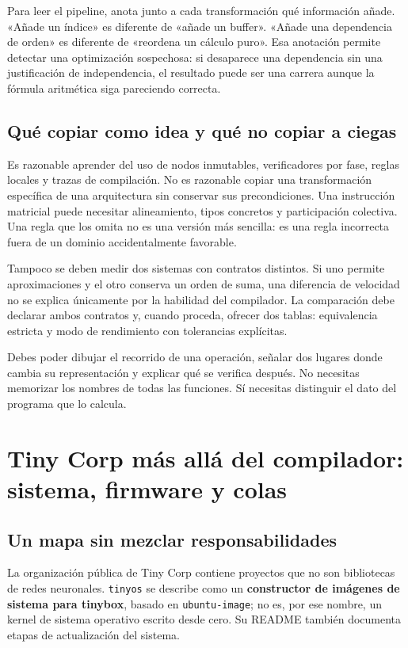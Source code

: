 \documentclass[12pt,a4paper,oneside]{report}
\begin{document}
Para leer el pipeline, anota junto a cada transformación qué información añade. «Añade un índice» es diferente de «añade un buffer». «Añade una dependencia de orden» es diferente de «reordena un cálculo puro». Esa anotación permite detectar una optimización sospechosa: si desaparece una dependencia sin una justificación de independencia, el resultado puede ser una carrera aunque la fórmula aritmética siga pareciendo correcta.

\section{Qué copiar como idea y qué no copiar a ciegas}
Es razonable aprender del uso de nodos inmutables, verificadores por fase, reglas locales y trazas de compilación. No es razonable copiar una transformación específica de una arquitectura sin conservar sus precondiciones. Una instrucción matricial puede necesitar alineamiento, tipos concretos y participación colectiva. Una regla que los omita no es una versión más sencilla: es una regla incorrecta fuera de un dominio accidentalmente favorable.

Tampoco se deben medir dos sistemas con contratos distintos. Si uno permite aproximaciones y el otro conserva un orden de suma, una diferencia de velocidad no se explica únicamente por la habilidad del compilador. La comparación debe declarar ambos contratos y, cuando proceda, ofrecer dos tablas: equivalencia estricta y modo de rendimiento con tolerancias explícitas.

\begin{comprueba}
Debes poder dibujar el recorrido de una operación, señalar dos lugares donde cambia su representación y explicar qué se verifica después. No necesitas memorizar los nombres de todas las funciones. Sí necesitas distinguir el dato del programa que lo calcula.

\end{comprueba}
\chapter{Tiny Corp más allá del compilador: sistema, firmware y colas}
\label{ch:tinycorp-sistemas}
\section{Un mapa sin mezclar responsabilidades}
La organización pública de Tiny Corp contiene proyectos que no son bibliotecas de redes neuronales. \texttt{tinyos} se describe como un \textbf{constructor de imágenes de sistema para tinybox}, basado en \texttt{ubuntu-image}; no es, por ese nombre, un kernel de sistema operativo escrito desde cero. Su README también documenta etapas de actualización del sistema. \cite{tinyos}
\end{document}
